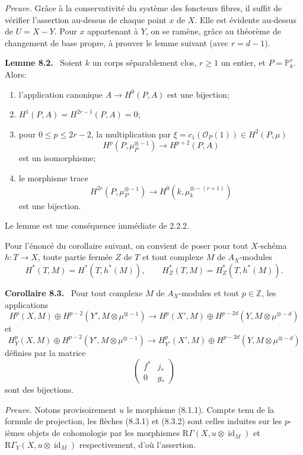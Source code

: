 \documentclass[11pt]{article}
\newenvironment{statement}[1]{\par\medskip\noindent\textbf{#1.}\ }{\par\medskip}
\newcommand{\R}{\mathrm{R}}\newcommand{\RHomCore}{\mathrm{RHom}}
\providecommand{\R}{\mathrm R}
\begin{document}
\emph{Preuve.} Grâce à la conservativité du système des foncteurs fibres, il suffit de vérifier l'assertion au-dessus de chaque point $x$ de $X$. Elle est évidente au-dessus de $U=X-Y$. Pour $x$ appartenant à $Y$, on se ramène, grâce au théorème de changement de base propre, à prouver le lemme suivant (avec $r=d-1$).

\begin{statement}{Lemme 8.2}
Soient $k$ un corps séparablement clos, $r\ge1$ un entier, et $P=\mathbb P_k^r$. Alors:
\begin{enumerate}[label=\alph*)]
\item l'application canonique $A\to H^0(P,A)$ est une bijection;
\item $H^1(P,A)=H^{2r-1}(P,A)=0$;
\item pour $0\le p\le2r-2$, la multiplication par $\xi=c_1(\mathcal O_P(1))\in H^2(P,\mu)$
\[
H^p(P,\mu_P^{\otimes -1})\to H^{p+2}(P,A)
\]
est un isomorphisme;
\item le morphisme trace
\[
H^{2r}(P,\mu_P^{\otimes -1})\to H^0(k,\mu_k^{\otimes -(r+1)})
\]
est une bijection.
\end{enumerate}
\end{statement}

Le lemme est une conséquence immédiate de 2.2.2.

Pour l'énoncé du corollaire suivant, on convient de poser pour tout $X$-schéma $h:T\to X$, toute partie fermée $Z$ de $T$ et tout complexe $M$ de $A_X$-modules
\[
H^*(T,M)=H^*(T,h^*(M)),\qquad
H^*_Z(T,M)=H^*_Z(T,h^*(M)).
\]

\begin{statement}{Corollaire 8.3}
Pour tout complexe $M$ de $A_X$-modules et tout $p\in\mathbb Z$, les applications
\[
H^p(X,M)\oplus H^{p-2}(Y',M\otimes\mu^{\otimes -1})
\to
H^p(X',M)\oplus H^{p-2d}(Y,M\otimes\mu^{\otimes -d})
\tag{8.3.1}
\]
et
\[
H_Y^p(X,M)\oplus H^{p-2}(Y',M\otimes\mu^{\otimes -1})
\to
H_{Y'}^p(X',M)\oplus H^{p-2d}(Y,M\otimes\mu^{\otimes -d})
\tag{8.3.2}
\]
définies par la matrice
\[
\begin{pmatrix}
f^*&j_*\\
0&g_*
\end{pmatrix}
\]
sont des bijections.
\end{statement}

\emph{Preuve.} Notons provisoirement $u$ le morphisme (8.1.1). Compte tenu de la formule de projection, les flèches (8.3.1) et (8.3.2) sont celles induites sur les $p$-ièmes objets de cohomologie par les morphismes $\R\Gamma(X,u\otimes\operatorname{id}_M)$ et $\R\Gamma_Y(X,u\otimes\operatorname{id}_M)$ respectivement, d'où l'assertion.
\end{document}
